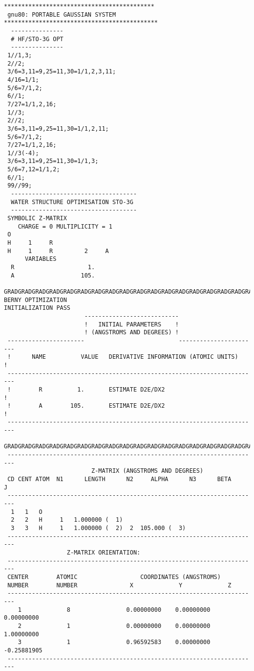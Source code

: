 \newpage
{\small
\begin{verbatim}
*******************************************
 gnu80: PORTABLE GAUSSIAN SYSTEM
********************************************
  ---------------
  # HF/STO-3G OPT 
  ---------------
 1//1,3;
 2//2;
 3/6=3,11=9,25=11,30=1/1,2,3,11;
 4/16=1/1;
 5/6=7/1,2;
 6//1;
 7/27=1/1,2,16;
 1//3;
 2//2;
 3/6=3,11=9,25=11,30=1/1,2,11;
 5/6=7/1,2;
 7/27=1/1,2,16;
 1//3(-4);
 3/6=3,11=9,25=11,30=1/1,3;
 5/6=7,12=1/1,2;
 6//1;
 99//99;
  ------------------------------------
  WATER STRUCTURE OPTIMISATION STO-3G  
  ------------------------------------
 SYMBOLIC Z-MATRIX
    CHARGE = 0 MULTIPLICITY = 1
 O
 H     1     R
 H     1     R         2     A
      VARIABLES
  R                     1.                    
  A                   105.                    
 GRADGRADGRADGRADGRADGRADGRADGRADGRADGRADGRADGRADGRADGRADGRADGRADGRADGRAD
BERNY OPTIMIZATION
INITIALIZATION PASS
                       ---------------------------
                       !   INITIAL PARAMETERS    !
                       ! (ANGSTROMS AND DEGREES) !
 ----------------------                           -----------------------
 !      NAME          VALUE   DERIVATIVE INFORMATION (ATOMIC UNITS)     !
 ------------------------------------------------------------------------
 !        R          1.       ESTIMATE D2E/DX2                          !
 !        A        105.       ESTIMATE D2E/DX2                          !
 ------------------------------------------------------------------------
 GRADGRADGRADGRADGRADGRADGRADGRADGRADGRADGRADGRADGRADGRADGRADGRADGRADGRAD
 ------------------------------------------------------------------------
                         Z-MATRIX (ANGSTROMS AND DEGREES)
 CD CENT ATOM  N1      LENGTH      N2     ALPHA      N3      BETA       J
 ------------------------------------------------------------------------
  1   1   O 
  2   2   H     1   1.000000 (  1)
  3   3   H     1   1.000000 (  2)  2  105.000 (  3)
 ------------------------------------------------------------------------
                  Z-MATRIX ORIENTATION:
 ------------------------------------------------------------------------
 CENTER        ATOMIC                  COORDINATES (ANGSTROMS)
 NUMBER        NUMBER               X             Y             Z
 ------------------------------------------------------------------------
    1             8                0.00000000    0.00000000    0.00000000
    2             1                0.00000000    0.00000000    1.00000000
    3             1                0.96592583    0.00000000   -0.25881905
 ------------------------------------------------------------------------

\end{verbatim}}
